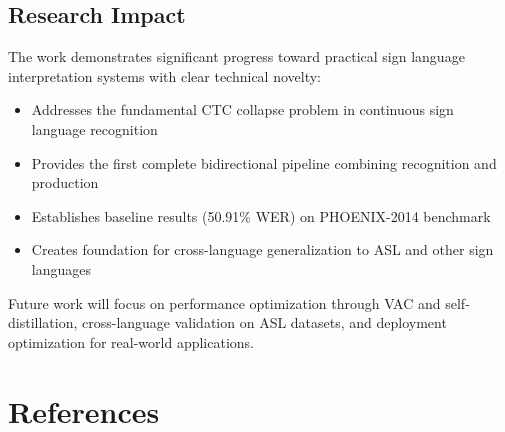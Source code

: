 \documentclass[12pt,a4paper]{article}
\begin{document}
\subsection{Research Impact}

The work demonstrates significant progress toward practical sign language interpretation systems with clear technical novelty:
\begin{itemize}[noitemsep]
    \item Addresses the fundamental CTC collapse problem in continuous sign language recognition
    \item Provides the first complete bidirectional pipeline combining recognition and production
    \item Establishes baseline results (50.91\% WER) on PHOENIX-2014 benchmark
    \item Creates foundation for cross-language generalization to ASL and other sign languages
\end{itemize}

Future work will focus on performance optimization through VAC and self-distillation, cross-language validation on ASL datasets, and deployment optimization for real-world applications.

\section*{References}
\end{document}

